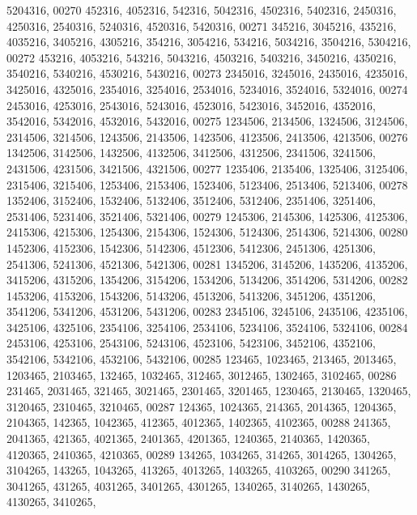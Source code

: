 \begin{DoxyCode}
      5204316,
00270        452316, 4052316,  542316, 5042316, 4502316, 5402316, 2450316, 4250316, 2540316, 5240316, 4520316, 
      5420316,
00271        345216, 3045216,  435216, 4035216, 3405216, 4305216,  354216, 3054216,  534216, 5034216, 3504216, 
      5304216,
00272        453216, 4053216,  543216, 5043216, 4503216, 5403216, 3450216, 4350216, 3540216, 5340216, 4530216, 
      5430216,
00273       2345016, 3245016, 2435016, 4235016, 3425016, 4325016, 2354016, 3254016, 2534016, 5234016, 3524016, 
      5324016,
00274       2453016, 4253016, 2543016, 5243016, 4523016, 5423016, 3452016, 4352016, 3542016, 5342016, 4532016, 
      5432016,
00275       1234506, 2134506, 1324506, 3124506, 2314506, 3214506, 1243506, 2143506, 1423506, 4123506, 2413506, 
      4213506,
00276       1342506, 3142506, 1432506, 4132506, 3412506, 4312506, 2341506, 3241506, 2431506, 4231506, 3421506, 
      4321506,
00277       1235406, 2135406, 1325406, 3125406, 2315406, 3215406, 1253406, 2153406, 1523406, 5123406, 2513406, 
      5213406,
00278       1352406, 3152406, 1532406, 5132406, 3512406, 5312406, 2351406, 3251406, 2531406, 5231406, 3521406, 
      5321406,
00279       1245306, 2145306, 1425306, 4125306, 2415306, 4215306, 1254306, 2154306, 1524306, 5124306, 2514306, 
      5214306,
00280       1452306, 4152306, 1542306, 5142306, 4512306, 5412306, 2451306, 4251306, 2541306, 5241306, 4521306, 
      5421306,
00281       1345206, 3145206, 1435206, 4135206, 3415206, 4315206, 1354206, 3154206, 1534206, 5134206, 3514206, 
      5314206,
00282       1453206, 4153206, 1543206, 5143206, 4513206, 5413206, 3451206, 4351206, 3541206, 5341206, 4531206, 
      5431206,
00283       2345106, 3245106, 2435106, 4235106, 3425106, 4325106, 2354106, 3254106, 2534106, 5234106, 3524106, 
      5324106,
00284       2453106, 4253106, 2543106, 5243106, 4523106, 5423106, 3452106, 4352106, 3542106, 5342106, 4532106, 
      5432106,
00285        123465, 1023465,  213465, 2013465, 1203465, 2103465,  132465, 1032465,  312465, 3012465, 1302465, 
      3102465,
00286        231465, 2031465,  321465, 3021465, 2301465, 3201465, 1230465, 2130465, 1320465, 3120465, 2310465, 
      3210465,
00287        124365, 1024365,  214365, 2014365, 1204365, 2104365,  142365, 1042365,  412365, 4012365, 1402365, 
      4102365,
00288        241365, 2041365,  421365, 4021365, 2401365, 4201365, 1240365, 2140365, 1420365, 4120365, 2410365, 
      4210365,
00289        134265, 1034265,  314265, 3014265, 1304265, 3104265,  143265, 1043265,  413265, 4013265, 1403265, 
      4103265,
00290        341265, 3041265,  431265, 4031265, 3401265, 4301265, 1340265, 3140265, 1430265, 4130265, 3410265, 

\end{DoxyCode}
